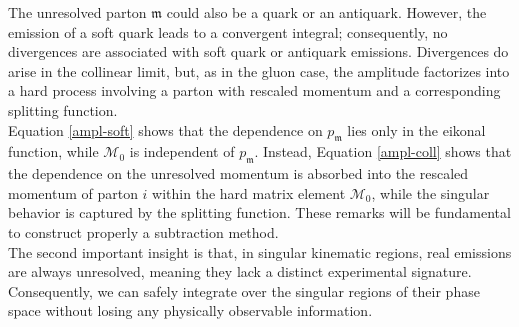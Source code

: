 \documentclass[a4paper, 12pt]{book}
\newcommand{\um}{\mathfrak{m}}
\begin{document}
The unresolved parton $\um$ could also be a quark or an antiquark. However, the emission of a soft quark leads to a convergent integral; consequently, no divergences are associated with soft quark or antiquark emissions. Divergences do arise in the collinear limit, but, as in the gluon case, the amplitude factorizes into a hard process involving a parton with rescaled momentum and a corresponding splitting function. \\
Equation \ref{ampl-soft} shows that the dependence on $p_\um$ lies only in the eikonal function, while $\mathcal{M}_0$ is independent of $p_\um$. Instead, Equation \ref{ampl-coll} shows that the dependence on the unresolved momentum is absorbed into the rescaled momentum of parton $i$ within the hard matrix element $\mathcal{M}_0$, while the singular behavior is captured by the splitting function. These remarks will be fundamental to construct properly a subtraction method. \\
The second important insight is that, in singular kinematic regions, real emissions are always unresolved, meaning they lack a distinct experimental signature. Consequently, we can safely integrate over the singular regions of their phase space without losing any physically observable information. \\
\end{document}
